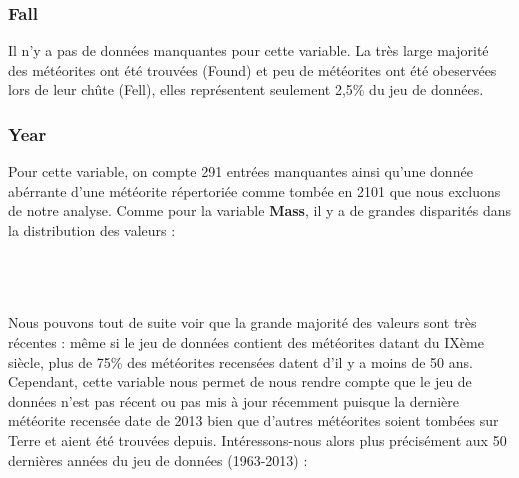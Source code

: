 \documentclass[12pt]{article}
\begin{document}
\subsubsection*{Fall}
Il n'y a pas de données manquantes pour cette variable. La très large majorité des météorites ont été trouvées (Found) et peu de météorites ont été obeservées lors de leur chûte (Fell), elles représentent seulement 2,5\% du jeu de données.
\subsubsection*{Year}
Pour cette variable, on compte 291 entrées manquantes ainsi qu'une donnée abérrante d'une météorite répertoriée comme tombée en 2101 que nous excluons de notre analyse. Comme pour la variable \textbf{Mass}, il y a de grandes disparités dans la distribution des valeurs :\\
\\
\\
\\
Nous pouvons tout de suite voir que la grande majorité des valeurs sont très récentes : même si le jeu de données contient des météorites datant du IXème siècle, plus de 75\% des météorites recensées datent d'il y a moins de 50 ans. Cependant, cette variable nous permet de nous rendre compte que le jeu de données n'est pas récent ou pas mis à jour récemment puisque la dernière météorite recensée date de 2013 bien que d'autres météorites soient tombées sur Terre et aient été trouvées depuis. Intéressons-nous alors plus précisément aux 50 dernières années du jeu de données (1963-2013) :\\
\end{document}
